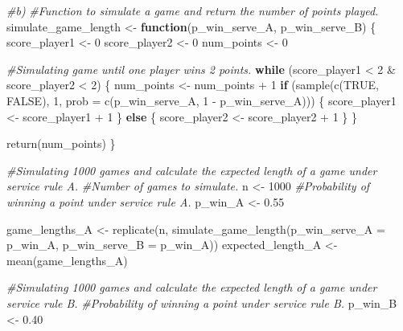 \documentclass[
]{article}
\newenvironment{Shaded}{\begin{snugshade}}{\end{snugshade}}
\newcommand{\AttributeTok}[1]{\textcolor[rgb]{0.77,0.63,0.00}{#1}}
\newcommand{\CommentTok}[1]{\textcolor[rgb]{0.56,0.35,0.01}{\textit{#1}}}
\newcommand{\ConstantTok}[1]{\textcolor[rgb]{0.00,0.00,0.00}{#1}}
\newcommand{\ControlFlowTok}[1]{\textcolor[rgb]{0.13,0.29,0.53}{\textbf{#1}}}
\newcommand{\DecValTok}[1]{\textcolor[rgb]{0.00,0.00,0.81}{#1}}
\newcommand{\FloatTok}[1]{\textcolor[rgb]{0.00,0.00,0.81}{#1}}
\newcommand{\FunctionTok}[1]{\textcolor[rgb]{0.00,0.00,0.00}{#1}}
\newcommand{\NormalTok}[1]{#1}
\newcommand{\OtherTok}[1]{\textcolor[rgb]{0.56,0.35,0.01}{#1}}
\newcommand{\SpecialCharTok}[1]{\textcolor[rgb]{0.00,0.00,0.00}{#1}}
\begin{document}
\begin{Shaded}
\begin{Highlighting}[]
\CommentTok{\#b)}
\CommentTok{\#Function to simulate a game and return the number of points played.}
\NormalTok{simulate\_game\_length }\OtherTok{\textless{}{-}} \ControlFlowTok{function}\NormalTok{(p\_win\_serve\_A, p\_win\_serve\_B) \{}
\NormalTok{  score\_player1 }\OtherTok{\textless{}{-}} \DecValTok{0}
\NormalTok{  score\_player2 }\OtherTok{\textless{}{-}} \DecValTok{0}
\NormalTok{  num\_points }\OtherTok{\textless{}{-}} \DecValTok{0}
  
  \CommentTok{\#Simulating game until one player wins 2 points.}
  \ControlFlowTok{while}\NormalTok{ (score\_player1 }\SpecialCharTok{\textless{}} \DecValTok{2} \SpecialCharTok{\&}\NormalTok{ score\_player2 }\SpecialCharTok{\textless{}} \DecValTok{2}\NormalTok{) \{}
\NormalTok{    num\_points }\OtherTok{\textless{}{-}}\NormalTok{ num\_points }\SpecialCharTok{+} \DecValTok{1}
    \ControlFlowTok{if}\NormalTok{ (}\FunctionTok{sample}\NormalTok{(}\FunctionTok{c}\NormalTok{(}\ConstantTok{TRUE}\NormalTok{, }\ConstantTok{FALSE}\NormalTok{), }\DecValTok{1}\NormalTok{, }\AttributeTok{prob =} \FunctionTok{c}\NormalTok{(p\_win\_serve\_A, }\DecValTok{1} \SpecialCharTok{{-}}\NormalTok{ p\_win\_serve\_A))) \{}
\NormalTok{      score\_player1 }\OtherTok{\textless{}{-}}\NormalTok{ score\_player1 }\SpecialCharTok{+} \DecValTok{1}
\NormalTok{    \} }\ControlFlowTok{else}\NormalTok{ \{}
\NormalTok{      score\_player2 }\OtherTok{\textless{}{-}}\NormalTok{ score\_player2 }\SpecialCharTok{+} \DecValTok{1}
\NormalTok{    \}}
\NormalTok{  \}}
  
  \FunctionTok{return}\NormalTok{(num\_points)}
\NormalTok{\}}

\CommentTok{\#Simulating 1000 games and calculate the expected length of a game under service rule A.}
\CommentTok{\#Number of games to simulate.}
\NormalTok{n }\OtherTok{\textless{}{-}} \DecValTok{1000} 
\CommentTok{\#Probability of winning a point under service rule A.}
\NormalTok{p\_win\_A }\OtherTok{\textless{}{-}} \FloatTok{0.55} 

\NormalTok{game\_lengths\_A }\OtherTok{\textless{}{-}} \FunctionTok{replicate}\NormalTok{(n, }\FunctionTok{simulate\_game\_length}\NormalTok{(}\AttributeTok{p\_win\_serve\_A =}\NormalTok{ p\_win\_A, }\AttributeTok{p\_win\_serve\_B =}\NormalTok{ p\_win\_A))}
\NormalTok{expected\_length\_A }\OtherTok{\textless{}{-}} \FunctionTok{mean}\NormalTok{(game\_lengths\_A)}

\CommentTok{\#Simulating 1000 games and calculate the expected length of a game under service rule B.}
\CommentTok{\#Probability of winning a point under service rule B.}
\NormalTok{p\_win\_B }\OtherTok{\textless{}{-}} \FloatTok{0.40} 


\end{Highlighting}
\end{Shaded}
\end{document}

